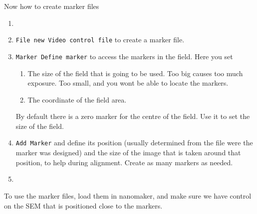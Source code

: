 
 Now how to create marker files
 \begin{enumerate}
 \item {}
 \item \texttt{File  \ira new Video  control file} to create  a marker
   file.
 \item \texttt{Marker \ira Define marker} to access the markers in the
   field. Here you set
   \begin{enumerate}
   \item The  size of  the field  that is  going to  be used.  Too big
     causes too  much exposure.  Too small,  and you  wont be  able to
     locate the markers.
   \item The coordinate of the field area.
   \end{enumerate}
   By default there is a zero marker  for the centre of the field. Use
   it to set the size of the field.
 \item \texttt{Add Marker} and define its position (usually determined
   from the  file were the  marker was designed)  and the size  of the
   image  that  is   taken  around  that  position,   to  help  during
   alignment. Create as many markers as needed.
 \item {}
 \end{enumerate}

 To use  the marker files,  load them in  nanomaker, and make  sure we
 have control on the SEM that is positioned close to the markers.

